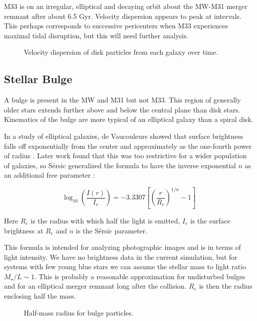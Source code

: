 \documentclass[twocolumn]{aastex63}
\newcommand{\todo}{\color{red}{TODO}\color{black}\hspace{2mm}}
\begin{document}
M33 is on an irregular, elliptical and decaying orbit about the MW-M31 merger remnant after about 6.5 Gyr. Velocity dispersion appears to peak at intervals. This perhaps corresponds to successive pericenters when M33 experiences maximal tidal disruption, but this will need further analysis.

\begin{figure}[htb!]
	\caption{Velocity dispersion of disk particles from each galaxy over time.
		\label{fig:vel_disp}}
\end{figure}

\todo{disk rotation curve, $V_{rot}/\sigma$}

\subsection{Stellar Bulge}

A bulge is present in the MW and M31 but not M33. This region of generally older stars extends further above and below the central plane than disk stars. Kinematics of the bulge are more typical of an elliptical galaxy than a spiral disk.

In a study of elliptical galaxies, de Vaucouleurs showed that surface brightness falls off exponentially from the center and approximately as the one-fourth power of radius \citep{de_vaucouleurs_recherches_1948}. Later work found that this was too restrictive for a wider population of galaxies, so Sérsic generalized the formula to have the inverse exponential $n$ as an additional free parameter \citep{sersic_influence_1963}:

\[ \log_{10} \left( \frac{I(r)}{I_e} \right) =  -3.3307 \left[ \left( \frac{r}{R_e} \right)^{1/n} - 1 \right] \]

Here $R_e$ is the radius with which half the light is emitted,  $I_e$ is the surface brightness at $R_e$ and $n$ is the Sérsic parameter.

This formula is intended for analyzing photographic images and is in terms of light intensity. We have no brightness data in the current simulation, but for systems with few young blue stars we can assume the stellar mass to light ratio $M_\star/L \sim 1$. This is probably a reasonable approximation for undisturbed bulges and for an elliptical merger remnant long after the collision. $R_e$ is then the radius enclosing half the mass.

\begin{figure}[bht!]
	\caption{Half-mass radius for bulge particles.
		\label{fig:sersic_Re}}
\end{figure}
\end{document}
